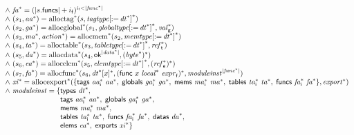 $$\begin{array}[t]{@{}lcl@{}l@{}}
{\begin{array}[t]{@{}l@{}}
{\land}~ {{\mathit{fa}}^\ast} = {({|s{.}\mathsf{funcs}|} + i_{\mathsf{f}})^{i_{\mathsf{f}}<{|{{\mathit{func}}^\ast}|}}} \\
{\land}~ (s_1, {{\mathit{aa}}^\ast}) = {{{\mathrm{alloctag}}^\ast}}{(s, {{{\mathit{tagtype}}}{{}[ {:=}\, {{\mathit{dt}}^\ast} ]}^\ast})} \\
{\land}~ (s_2, {{\mathit{ga}}^\ast}) = {{{\mathrm{allocglobal}}^\ast}}{(s_1, {{{\mathit{globaltype}}}{{}[ {:=}\, {{\mathit{dt}}^\ast} ]}^\ast}, {{\mathit{val}}_{\mathsf{g}}^\ast})} \\
{\land}~ (s_3, {{\mathit{ma}}^\ast}, {{\mathit{action}}^\ast}) = {{{\mathrm{allocmem}}^\ast}}{(s_2, {{{\mathit{memtype}}}{{}[ {:=}\, {{\mathit{dt}}^\ast} ]}^\ast})} \\
{\land}~ (s_4, {{\mathit{ta}}^\ast}) = {{{\mathrm{alloctable}}^\ast}}{(s_3, {{{\mathit{tabletype}}}{{}[ {:=}\, {{\mathit{dt}}^\ast} ]}^\ast}, {{\mathit{ref}}_{\mathsf{t}}^\ast})} \\
{\land}~ (s_5, {{\mathit{da}}^\ast}) = {{{\mathrm{allocdata}}^\ast}}{(s_4, {\mathsf{ok}^{{|{{\mathit{data}}^\ast}|}}}, {({{\mathit{byte}}^\ast})^\ast})} \\
{\land}~ (s_6, {{\mathit{ea}}^\ast}) = {{{\mathrm{allocelem}}^\ast}}{(s_5, {{{\mathit{elemtype}}}{{}[ {:=}\, {{\mathit{dt}}^\ast} ]}^\ast}, {({{\mathit{ref}}_{\mathsf{e}}^\ast})^\ast})} \\
{\land}~ (s_7, {{\mathit{fa}}^\ast}) = {{{\mathrm{allocfunc}}^\ast}}{(s_6, {{{\mathit{dt}}^\ast}{}[x]^\ast}, {(\mathsf{func}~x~{{\mathit{local}}^\ast}~{\mathit{expr}}_{\mathsf{f}})^\ast}, {{\mathit{moduleinst}}^{{|{{\mathit{func}}^\ast}|}}})} \\
{\land}~ {{\mathit{xi}}^\ast} = {{{\mathrm{allocexport}}^\ast}}{(\{ \mathsf{tags}~{{\mathit{aa}}_{\mathsf{i}}^\ast}~{{\mathit{aa}}^\ast},\; \mathsf{globals}~{{\mathit{ga}}_{\mathsf{i}}^\ast}~{{\mathit{ga}}^\ast},\; \mathsf{mems}~{{\mathit{ma}}_{\mathsf{i}}^\ast}~{{\mathit{ma}}^\ast},\; \mathsf{tables}~{{\mathit{ta}}_{\mathsf{i}}^\ast}~{{\mathit{ta}}^\ast},\; \mathsf{funcs}~{{\mathit{fa}}_{\mathsf{i}}^\ast}~{{\mathit{fa}}^\ast} \}, {{\mathit{export}}^\ast})} \\
{\land}~ {\mathit{moduleinst}} = \{ \begin{array}[t]{@{}l@{}}
\mathsf{types}~{{\mathit{dt}}^\ast},\; \\
  \mathsf{tags}~{{\mathit{aa}}_{\mathsf{i}}^\ast}~{{\mathit{aa}}^\ast},\; \mathsf{globals}~{{\mathit{ga}}_{\mathsf{i}}^\ast}~{{\mathit{ga}}^\ast},\; \\
  \mathsf{mems}~{{\mathit{ma}}_{\mathsf{i}}^\ast}~{{\mathit{ma}}^\ast},\; \\
  \mathsf{tables}~{{\mathit{ta}}_{\mathsf{i}}^\ast}~{{\mathit{ta}}^\ast},\; \mathsf{funcs}~{{\mathit{fa}}_{\mathsf{i}}^\ast}~{{\mathit{fa}}^\ast},\; \mathsf{datas}~{{\mathit{da}}^\ast},\; \\
  \mathsf{elems}~{{\mathit{ea}}^\ast},\; \mathsf{exports}~{{\mathit{xi}}^\ast} \}\end{array} \\
\end{array}
} \\
\end{array}
$$

